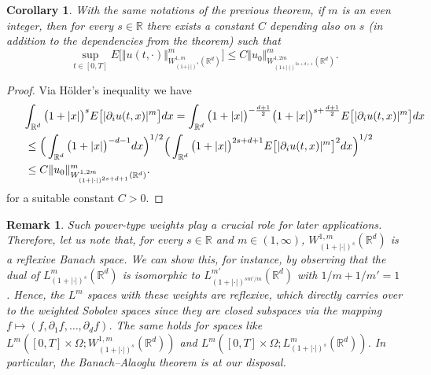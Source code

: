 \documentclass[a4paper,10pt]{article}
\newtheorem{corollary}[theorem]{Corollary}
\newtheorem{remark}[theorem]{Remark}
\newcommand\1{\mathbbm{1}}
\newcommand{\mr}{\mathbb{R}}
\numberwithin{equation}{section}
\begin{document}
\begin{corollary}
\label{Corollary a priori estimate}With the same notations of the previous
theorem, if $m$ is an even integer, then for every $s\in\mathbb{R}$ there exists a
constant $C$ depending also on $s$ \textup{(}in addition to the dependencies from the theorem\textup{)}
such that
\begin{equation*}
\sup_{t\in [0,T]}E \Big[ \Vert u(t,\cdot)\Vert_{W_{(1+\vert \cdot \vert)^{s}}^{1,m}(
\mathbb{R}^{d})}^{m} \Big] \leq C \Vert u_{0} \Vert_{W_{(1+\vert \cdot \vert)^{2s+d+1}}^{1,2m}(\mathbb{R}^{d})}^{m}.
\end{equation*}
\end{corollary}

\begin{proof}
Via H\"older's inequality we have
\begin{align*}
\lefteqn{ \int_{\mathbb{R}^{d}} \big(1+\vert x \vert \big)^{s} E\big[ \vert \partial_{i} u(t,x) \vert^{m}\big] dx 
=\int_{\mathbb{R}^{d}} \big(1+\vert x \vert \big)^{-\frac{d+1}{2}} \big(1+\vert x\vert \big)^{s+\frac{d+1}{2}} E\big[ \vert \partial_{i}u(t,x) \vert^{m}\big]  dx } \\
&  \leq \Big( \int_{\mathbb{R}^{d}} \big(1+\vert x \vert \big)^{-d-1}dx \Big)^{1/2} \Big( \int_{\mathbb{R}^{d}} \big(1+ \vert x \vert \big)^{2s+ d+1} E\big[ \vert \partial_{i}u(t,x) \vert^{m} \big]^{2} dx \Big)^{1/2}\\
&  \leq C \Vert u_{0} \Vert_{W_{(1+\vert \cdot \vert )^{2s+d+1}}^{1,2m}(\mathbb{R}^{d})}^{m}.
\end{align*}
for a suitable constant $C>0$.
\end{proof}

\begin{remark}
\label{rem_weihted_spaces_reflexive}
Such power-type weights play a crucial role for later applications. Therefore, let us note that, for every $s \in \mr$ and $m \in (1,\infty)$, $W^{1,m}_{(1+|\cdot|)^s}(\mr^d)$ is a reflexive Banach space. We can show this, for instance, by observing that the dual of $L^m_{(1+|\cdot|)^s}(\mr^d)$ is isomorphic to $L^{m'}_{(1+|\cdot|)^{sm'/m}}(\mr^d)$ with $1/m + 1/m' = 1$. Hence, the $L^m$ spaces with these weights are reflexive, which directly carries over to the weighted Sobolev spaces since they are closed subspaces via the mapping $f\mapsto(f,\partial_1f,\ldots,\partial_df)$. The same holds for spaces like $L^m([0,T]\times\Omega;W^{1,m}_{(1+|\cdot|)^s}(\mr^d))$ and $L^m([0,T]\times\Omega;L^m_{(1+|\cdot|)^s}(\mr^d))$. In particular, the Banach--Alaoglu theorem is at our disposal.
\end{remark}
\end{document}
